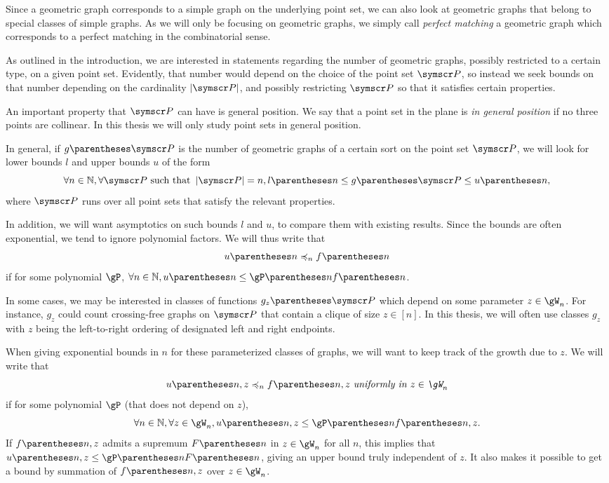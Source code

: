 Since a geometric graph corresponds to a simple graph on the underlying point set,
we can also look at geometric graphs that belong to special classes of simple graphs.
As we will only be focusing on geometric graphs, we simply call
\emph{perfect matching}
a geometric graph which corresponds to a perfect matching in the combinatorial sense.

As outlined in the introduction, we are interested in statements regarding the number
of geometric graphs, possibly restricted to a certain type, on a given point set.
Evidently, that number would depend on the choice of the point set $\pointset P$, so instead we seek
bounds on that number depending on the cardinality $\Cardinality {\pointset P}$, and possibly
restricting $\pointset P$ so that it satisfies certain properties.

An important property that $\pointset P$ can have is general position. We say that 
a point set in the plane is \emph{in general position} if no three points are collinear.
In this thesis we will only study point sets in general position.

In general, if $g\of {\pointset P}$ is the number of geometric graphs of a certain sort on the point
set $\pointset P$, we will look for lower bounds $l$ and upper bounds $u$ of the form\[
\forall n\in \N, \forall \pointset P \text{ such that } \Cardinality {\pointset P} = n,
l \of n \leq g \of {\pointset P} \leq u \of n \text,\]
where $\pointset P$ runs over all point sets that satisfy the relevant properties.

In addition, we will want asymptotics on such bounds $l$ and $u$, to compare them with
existing results. Since the bounds are often exponential, we tend to ignore polynomial
factors. We will thus write that\[
u \of n \preccurlyeq_n f \of n
\]
if for some polynomial $\gP$, $\forall n\in \N, u\of n \leq \gP\of n f \of n$.

In some cases, we may be interested in classes of functions $g_z\of{\pointset P}$
which depend on some parameter $z\in\gW_n$.
For instance, $g_z$ could count crossing-free graphs on $\pointset P$ that contain a clique of size
$z\in [n]$.
In this thesis, we will often use classes $g_z$ with $z$ being the left-to-right ordering
of designated left and right endpoints.

When giving exponential bounds in $n$ for these parameterized classes of graphs, we will want to keep
track of the growth due to $z$. We will write that\[
u \of {n,z} \preccurlyeq_n f \of {n,z} \text{ \emph{uniformly in $z\in\gW_n$}}\]
if for some polynomial $\gP$ (that does not depend on $z$),
\[\forall n\in \N,\forall z \in \gW_n, u\of {n,z} \leq \gP\of n f \of {n,z}\text.\]
If $f \of {n,z}$ admits a supremum $F \of {n}$ in $z\in\gW_n$ for all $n$, this implies
that $u\of {n,z} \leq \gP\of n F \of{n}$, giving an upper bound truly independent of $z$.
It also makes it possible to get a bound by summation of $f \of {n,z}$ over $z\in\gW_n$.

